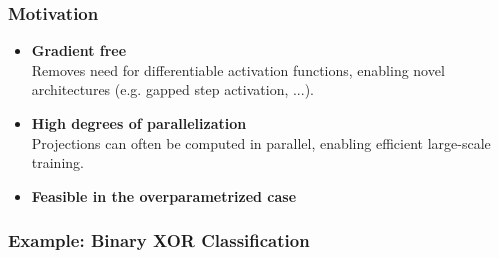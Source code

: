 \documentclass[t, xcolor=table, aspectratio=169]{beamer}
\begin{document}
    \begin{frame}
        \frametitle{Motivation}
        \vspace{1em}
        \begin{itemize}
            \setlength\itemsep{1.5em}
            
            \item[\color{KUL-BLUE}\large $\blacktriangleright$] 
            \textbf{Gradient free} \\
            \small Removes need for differentiable activation functions, enabling novel architectures (e.g. gapped step activation, ...).
            
            \item[\color{KUL-BLUE}\large $\blacktriangleright$] 
            \textbf{High degrees of parallelization} \\
            \small Projections can often be computed in parallel, enabling efficient large-scale training.
            
            \item[\color{KUL-BLUE}\large $\blacktriangleright$] 
            \textbf{Feasible in the overparametrized case} \\
        \end{itemize}
    \end{frame}

    \begin{frame}
        \frametitle{Example: Binary XOR Classification}
    \end{frame}
\end{document}
